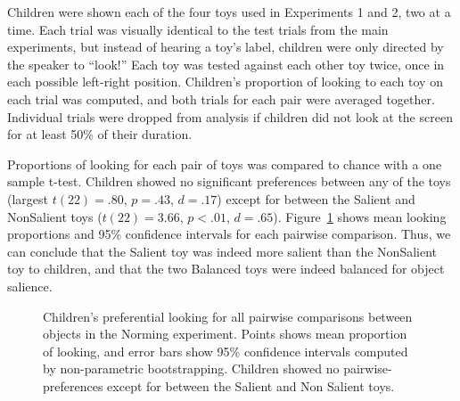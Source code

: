 \documentclass[man,floatsintext]{apa6}
\begin{document}
Children were shown each of the four toys used in Experiments 1 and 2, two at a time. Each trial was visually identical to the test trials from the main experiments, but instead of hearing a toy's label, children were only directed by the speaker to ``look!'' Each toy was tested against each other toy twice, once in each possible left-right position. Children's proportion of looking to each toy on each trial was computed, and both trials for each pair were averaged together. Individual trials were dropped from analysis if children did not look at the screen for at least 50\% of their duration.

Proportions of looking for each pair of toys was compared to chance with a one sample t-test. Children showed no significant preferences between any of the toys (largest $t(22) = .80$, $p = .43$, $d =.17$) except for between the Salient and NonSalient toys ($t(22) = 3.66$, $p < .01$, $d =.65$). Figure~\ref{fig:kid_norm} shows mean looking proportions and 95\% confidence intervals for each pairwise comparison. Thus, we can conclude that the Salient toy was indeed more salient than the NonSalient toy to children, and that the two Balanced toys were indeed balanced for object salience.

\begin{figure}[tb]
	\caption{\label{fig:kid_norm} Children's preferential looking for all pairwise comparisons between objects in the Norming experiment. Points shows mean proportion of looking, and error bars show 95\% confidence intervals computed by non-parametric bootstrapping. Children showed no pairwise-preferences except for between the Salient and Non Salient toys.}
\end{figure}



\end{document}
